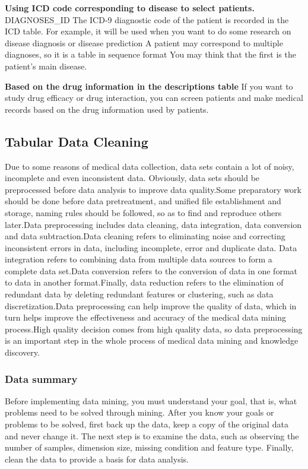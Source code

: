 \textbf{Using ICD code corresponding to disease to select patients.}
DIAGNOSES\_ID The ICD-9 diagnostic code of the patient is recorded in the ICD table. For example, it will be used when you want to do some research on disease diagnosis or disease prediction A patient may correspond to multiple diagnoses, so it is a table in sequence format You may think that the first is the patient's main disease.

\textbf{Based on the drug information in the descriptions table}
If you want to study drug efficacy or drug interaction, you can screen patients and make medical records based on the drug information used by patients.

\subsection{Tabular Data Cleaning}
Due to some reasons of medical data collection, data sets contain a lot of noisy, incomplete and even inconsistent data. Obviously, data sets should be preprocessed before data analysis to improve data quality.Some preparatory work should be done before data pretreatment, and unified file establishment and storage, naming rules should be followed, so as to find and reproduce others later.Data preprocessing includes data cleaning, data integration, data conversion and data subtraction.Data cleaning refers to eliminating noise and correcting inconsistent errors in data, including incomplete, error and duplicate data. Data integration refers to combining data from multiple data sources to form a complete data set.Data conversion refers to the conversion of data in one format to data in another format.Finally, data reduction refers to the elimination of redundant data by deleting redundant features or clustering, such as data discretization.Data preprocessing can help improve the quality of data, which in turn helps improve the effectiveness and accuracy of the medical data mining process.High quality decision comes from high quality data, so data preprocessing is an important step in the whole process of medical data mining and knowledge discovery.

\subsubsection{Data summary}
Before implementing data mining, you must understand your goal, that is, what problems need to be solved through mining. After you know your goals or problems to be solved, first back up the data, keep a copy of the original data and never change it. The next step is to examine the data, such as observing the number of samples, dimension size, missing condition and feature type. Finally, clean the data to provide a basis for data analysis.

